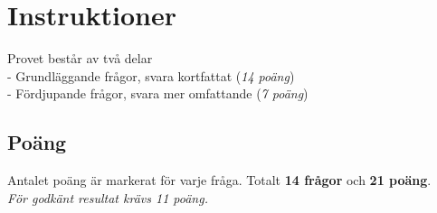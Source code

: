 \documentclass[a4paper,12pt]{exam}
\begin{document}
\section*{Instruktioner}
Provet består av två delar \\
    - Grundläggande frågor, svara kortfattat (\textit{14 poäng})\\
    - Fördjupande frågor, svara mer omfattande (\textit{7 poäng})

\subsection*{Poäng}
Antalet poäng är markerat för varje fråga. Totalt \textbf{14 frågor} och \textbf{21 poäng}.\\ \textit{För godkänt resultat krävs 11 poäng.}

\vspace{5mm} %
\begin{center}
\end{center}
\end{document}
